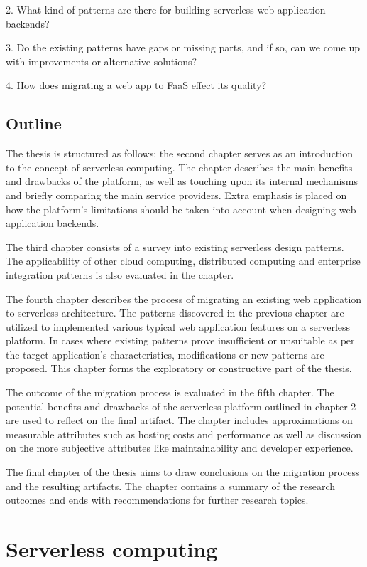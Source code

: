 \documentclass[utf8,english]{gradu3}
\begin{document}
2. What kind of patterns are there for building serverless web application backends?

3. Do the existing patterns have gaps or missing parts, and if so, can we come up with improvements or alternative solutions?

4. How does migrating a web app to FaaS effect its quality?

\section{Outline}

The thesis is structured as follows: the second chapter serves as an introduction to the concept of serverless computing. The chapter describes the main benefits and drawbacks of the platform, as well as touching upon its internal mechanisms and briefly comparing the main service providers. Extra emphasis is placed on how the platform's limitations should be taken into account when designing web application backends.

The third chapter consists of a survey into existing serverless design patterns. The applicability of other cloud computing, distributed computing and enterprise integration patterns is also evaluated in the chapter.

The fourth chapter describes the process of migrating an existing web application to serverless architecture. The patterns discovered in the previous chapter are utilized to implemented various typical web application features on a serverless platform. In cases where existing patterns prove insufficient or unsuitable as per the target application's characteristics, modifications or new patterns are proposed. This chapter forms the exploratory or constructive part of the thesis.

The outcome of the migration process is evaluated in the fifth chapter. The potential benefits and drawbacks of the serverless platform outlined in chapter 2 are used to reflect on the final artifact. The chapter includes approximations on measurable attributes such as hosting costs and performance as well as discussion on the more subjective attributes like maintainability and developer experience.

The final chapter of the thesis aims to draw conclusions on the migration process and the resulting artifacts. The chapter contains a summary of the research outcomes and ends with recommendations for further research topics.

\chapter{Serverless computing}
\end{document}
